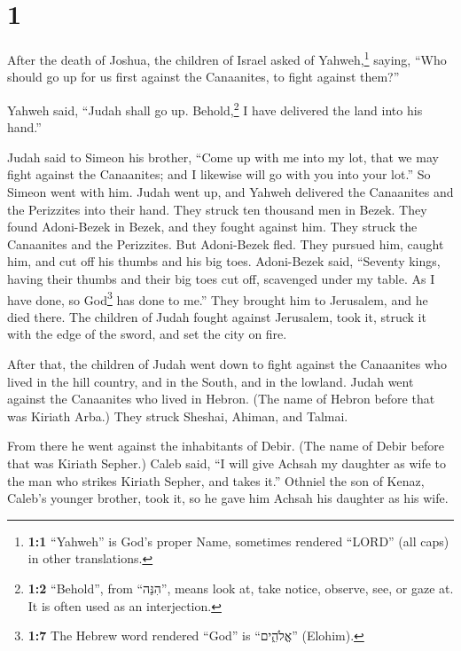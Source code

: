 \hypertarget{section}{%
\section{1}\label{section}}

 After the death of Joshua, the children of Israel asked
of Yahweh,\footnote{\textbf{1:1} ``Yahweh'' is God's proper Name,
  sometimes rendered ``LORD'' (all caps) in other translations.} saying,
``Who should go up for us first against the Canaanites, to fight against
them?''

 Yahweh said, ``Judah shall go up. Behold,\footnote{\textbf{1:2}
  ``Behold'', from ``הִנֵּה'', means look at, take notice, observe, see,
  or gaze at. It is often used as an interjection.} I have delivered the
land into his hand.''

 Judah said to Simeon his brother, ``Come up with me into
my lot, that we may fight against the Canaanites; and I likewise will go
with you into your lot.'' So Simeon went with him.  Judah
went up, and Yahweh delivered the Canaanites and the Perizzites into
their hand. They struck ten thousand men in Bezek.  They
found Adoni-Bezek in Bezek, and they fought against him. They struck the
Canaanites and the Perizzites.  But Adoni-Bezek fled. They
pursued him, caught him, and cut off his thumbs and his big toes.
 Adoni-Bezek said, ``Seventy kings, having their thumbs
and their big toes cut off, scavenged under my table. As I have done, so
God\footnote{\textbf{1:7} The Hebrew word rendered ``God'' is
  ``אֱלֹהִ֑ים'' (Elohim).} has done to me.'' They brought him to
Jerusalem, and he died there.  The children of Judah
fought against Jerusalem, took it, struck it with the edge of the sword,
and set the city on fire.

 After that, the children of Judah went down to fight
against the Canaanites who lived in the hill country, and in the South,
and in the lowland.  Judah went against the Canaanites
who lived in Hebron. (The name of Hebron before that was Kiriath Arba.)
They struck Sheshai, Ahiman, and Talmai.

 From there he went against the inhabitants of Debir.
(The name of Debir before that was Kiriath Sepher.) 
Caleb said, ``I will give Achsah my daughter as wife to the man who
strikes Kiriath Sepher, and takes it.''  Othniel the son
of Kenaz, Caleb's younger brother, took it, so he gave him Achsah his
daughter as his wife.

